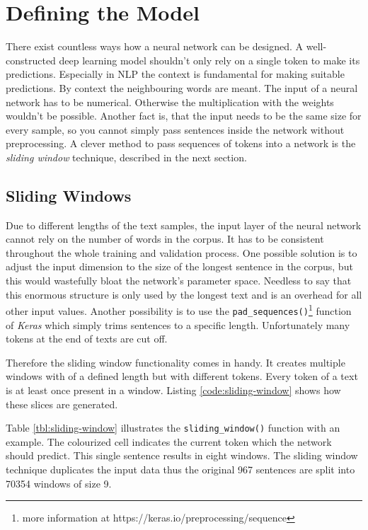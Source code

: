 \section{Defining the Model}

There exist countless ways how a neural network can be designed. A well-constructed deep learning model shouldn't only rely on a single token to make its predictions. Especially in NLP the context is fundamental for making suitable predictions. By context the neighbouring words are meant. The input of a neural network has to be numerical. Otherwise the multiplication with the weights wouldn't be possible. Another fact is, that the input needs to be the same size for every sample, so you cannot simply pass sentences inside the network without preprocessing. A clever method to pass sequences of tokens into a network is the \emph{sliding window} technique, described in the next section.

\subsection{Sliding Windows}
\label{chap:sliding-window}

Due to different lengths of the text samples, the input layer of the neural network cannot rely on the number of words in the corpus. It has to be consistent throughout the whole training and validation process. One possible solution is to adjust the input dimension to the size of the longest sentence in the corpus, but this would wastefully bloat the network's parameter space. Needless to say that this enormous structure is only used by the longest text and is an overhead for all other input values. Another possibility is to use the \verb|pad_sequences()|\footnote{more information at https://keras.io/preprocessing/sequence} function of \emph{Keras} which simply trims sentences to a specific length. Unfortunately many tokens at the end of texts are cut off.

Therefore the sliding window functionality comes in handy. It creates multiple windows with of a defined length but with different tokens. Every token of a text is at least once present in a window. Listing \ref{code:sliding-window} shows how these slices are generated.

Table \ref{tbl:sliding-window} illustrates the \verb|sliding_window()| function with an example. The colourized cell indicates the current token which the network should predict. This single sentence results in eight windows. The sliding window technique duplicates the input data thus the original 967 sentences are split into 70354 windows of size 9.

